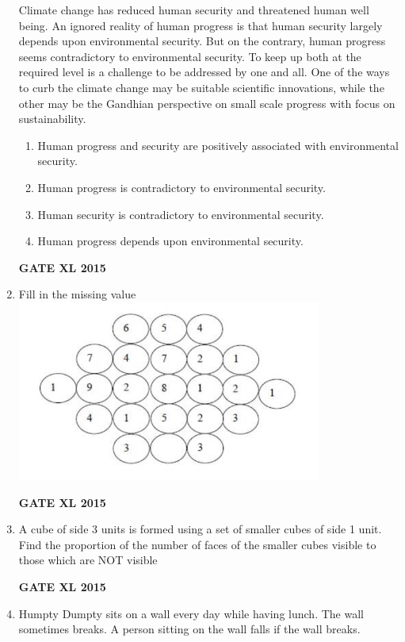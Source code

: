 \documentclass[journal,12pt,onecolumn]{IEEEtran}
\begin{document}
\begin{enumerate}
Climate change has reduced human security and threatened human well being. An ignored reality of human progress is that human security largely depends upon environmental security. But on the contrary, human progress seems contradictory to environmental security. To keep up both at the required level is a challenge to be addressed by one and all. One of the ways to curb the climate change may be suitable scientific innovations, while the other may be the Gandhian perspective on small scale progress with focus on sustainability.
    \begin{enumerate}
            \item Human progress and security are positively associated with environmental security.
            \item Human progress is contradictory to environmental security.
	\item Human security is contradictory to environmental security.  
            \item Human progress depends upon environmental security.
    \end{enumerate}
\begin{flushright}\textbf{GATE XL 2015}\end{flushright}
\item Fill in the missing value
	\includegraphics[width=10cm]{8}
\begin{flushright}\textbf{GATE XL 2015}\end{flushright}
\item 
A cube of side 3 units is formed using a set of smaller cubes of side 1 unit. Find the proportion of the number of faces of the smaller cubes visible to those which are NOT visible
    \begin{enumerate}
    \end{enumerate}
\begin{flushright}\textbf{GATE XL 2015}\end{flushright}
\item Humpty Dumpty sits on a wall every day while having lunch. The wall sometimes breaks. A person sitting on the wall falls if the wall breaks.


\end{enumerate}
\end{document}
